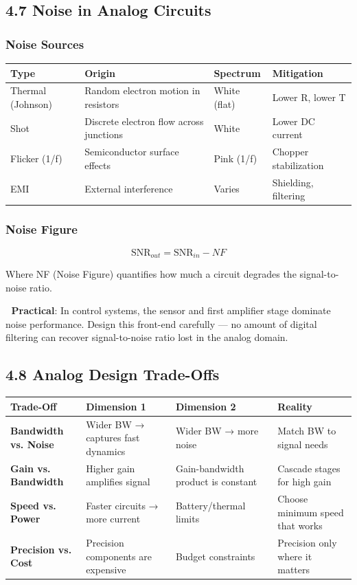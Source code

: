 \documentclass[11pt,a4paper]{book}
\begin{document}
\subsection{4.7 Noise in Analog Circuits}

\subsubsection{Noise Sources}

\begin{center}
\begin{tabular}{|l|l|l|l|}
\hline
Type & Origin & Spectrum & Mitigation \\
\hline
Thermal (Johnson) & Random electron motion in resistors & White (flat) & Lower R, lower T \\
Shot & Discrete electron flow across junctions & White & Lower DC current \\
Flicker (1/f) & Semiconductor surface effects & Pink (1/f) & Chopper stabilization \\
EMI & External interference & Varies & Shielding, filtering \\
\hline
\end{tabular}
\end{center}

\subsubsection{Noise Figure}

\[\text{SNR}_{out} = \text{SNR}_{in} - NF\]

Where NF (Noise Figure) quantifies how much a circuit degrades the signal-to-noise ratio.

🔧 \textbf{Practical}: In control systems, the sensor and first amplifier stage dominate noise performance. Design this front-end carefully — no amount of digital filtering can recover signal-to-noise ratio lost in the analog domain.

\medskip\noindent\hrulefill\medskip

\subsection{4.8 Analog Design Trade-Offs}

\begin{center}
\begin{tabular}{|l|l|l|l|}
\hline
Trade-Off & Dimension 1 & Dimension 2 & Reality \\
\hline
\textbf{Bandwidth vs. Noise} & Wider BW → captures fast dynamics & Wider BW → more noise & Match BW to signal needs \\
\textbf{Gain vs. Bandwidth} & Higher gain amplifies signal & Gain-bandwidth product is constant & Cascade stages for high gain \\
\textbf{Speed vs. Power} & Faster circuits → more current & Battery/thermal limits & Choose minimum speed that works \\
\textbf{Precision vs. Cost} & Precision components are expensive & Budget constraints & Precision only where it matters \\
\hline
\end{tabular}
\end{center}
\end{document}
